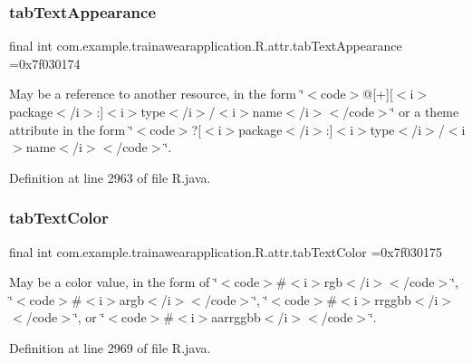 \subsubsection{\texorpdfstring{tabTextAppearance}{tabTextAppearance}}
{\footnotesize\ttfamily final int com.\+example.\+trainawearapplication.\+R.\+attr.\+tab\+Text\+Appearance =0x7f030174\hspace{0.3cm}{\ttfamily [static]}}

May be a reference to another resource, in the form \char`\"{}$<$code$>$@\mbox{[}+\mbox{]}\mbox{[}$<$i$>$package$<$/i$>$\+:\mbox{]}$<$i$>$type$<$/i$>$/$<$i$>$name$<$/i$>$$<$/code$>$\char`\"{} or a theme attribute in the form \char`\"{}$<$code$>$?\mbox{[}$<$i$>$package$<$/i$>$\+:\mbox{]}$<$i$>$type$<$/i$>$/$<$i$>$name$<$/i$>$$<$/code$>$\char`\"{}. 

Definition at line 2963 of file R.\+java.

\mbox{\label{classcom_1_1example_1_1trainawearapplication_1_1_r_1_1attr_a00c460d6916893121f484539104b8b31}} 
\subsubsection{\texorpdfstring{tabTextColor}{tabTextColor}}
{\footnotesize\ttfamily final int com.\+example.\+trainawearapplication.\+R.\+attr.\+tab\+Text\+Color =0x7f030175\hspace{0.3cm}{\ttfamily [static]}}

May be a color value, in the form of \char`\"{}$<$code$>$\#$<$i$>$rgb$<$/i$>$$<$/code$>$\char`\"{}, \char`\"{}$<$code$>$\#$<$i$>$argb$<$/i$>$$<$/code$>$\char`\"{}, \char`\"{}$<$code$>$\#$<$i$>$rrggbb$<$/i$>$$<$/code$>$\char`\"{}, or \char`\"{}$<$code$>$\#$<$i$>$aarrggbb$<$/i$>$$<$/code$>$\char`\"{}. 

Definition at line 2969 of file R.\+java.

\mbox{\label{classcom_1_1example_1_1trainawearapplication_1_1_r_1_1attr_a2796ae383c1b37f83e5aded2b42d9b06}} 
